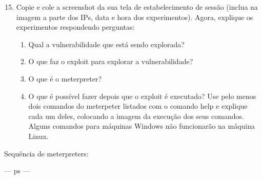 \documentclass{article}
\begin{document}
    \begin{superframe}
        \begin{enumerate}
            \setcounter{enumi}{14}
            \item Copie e cole a screenshot da sua tela de estabelecimento de
                sessão (inclua na imagem a parte dos IPs, data e hora dos
                experimentos). Agora, explique os experimentos respondendo
                perguntas:

            \begin{enumerate}
                \item Qual a vulnerabilidade que está sendo explorada?
                \item O que faz o exploit para explorar a vulnerabilidade?
                \item O que é o meterpreter?
                \item O que é possível fazer depois que o exploit é executado?
                    Use pelo menos dois comandos do meterpeter listados com o
                    comando help e explique cada um deles, colocando a imagem
                    da execução dos seus comandos. Alguns comandos para
                    máquinas Windows não funcionarão na máquina Linux.
            \end{enumerate}
        \end{enumerate}
    \end{superframe}

    Sequência de meterpreters:

    --- ps
    ---
\end{document}

